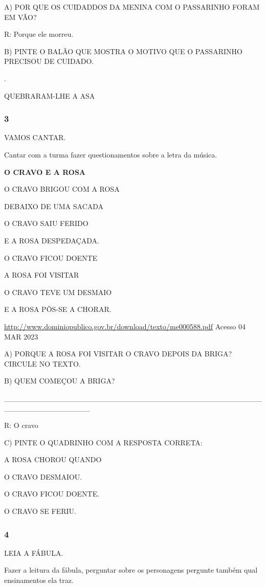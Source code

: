 A) POR QUE OS CUIDADDOS DA MENINA COM O PASSARINHO FORAM EM VÃO?

R: Porque ele morreu.

B) PINTE O BALÃO QUE MOSTRA O MOTIVO QUE O PASSARINHO PRECISOU DE
CUIDADO.

.

QUEBRARAM-LHE A ASA

\subsubsection{3 }\label{section-70}

VAMOS CANTAR.

Cantar com a turma fazer questionamentos sobre a letra da música.

\textbf{O CRAVO E A ROSA}

O CRAVO BRIGOU COM A ROSA

DEBAIXO DE UMA SACADA

O CRAVO SAIU FERIDO

E A ROSA DESPEDAÇADA.

\protect\hypertarget{_Hlk128859393}{}{}O CRAVO FICOU DOENTE

A ROSA FOI VISITAR

O CRAVO TEVE UM DESMAIO

E A ROSA PÔS-SE A CHORAR.

\url{http://www.dominiopublico.gov.br/download/texto/me000588.pdf}
Acesso 04 MAR 2023

A) PORQUE A ROSA FOI VISITAR O CRAVO DEPOIS DA BRIGA? CIRCULE NO TEXTO.

B) QUEM COMEÇOU A BRIGA?

\_\_\_\_\_\_\_\_\_\_\_\_\_\_\_\_\_\_\_\_\_\_\_\_\_\_\_\_\_\_\_\_\_\_\_\_\_\_\_\_\_\_\_\_\_\_\_\_\_\_\_\_\_\_\_\_\_\_\_\_\_\_\_\_

R: O cravo

C) PINTE O QUADRINHO COM A RESPOSTA CORRETA:

A ROSA CHOROU QUANDO

O CRAVO DESMAIOU.

O CRAVO FICOU DOENTE.

O CRAVO SE FERIU.

\subsubsection{4 }\label{section-71}

LEIA A FÁBULA.

Fazer a leitura da fábula, perguntar sobre os personagens pergunte
também qual ensinamentos ela traz.

